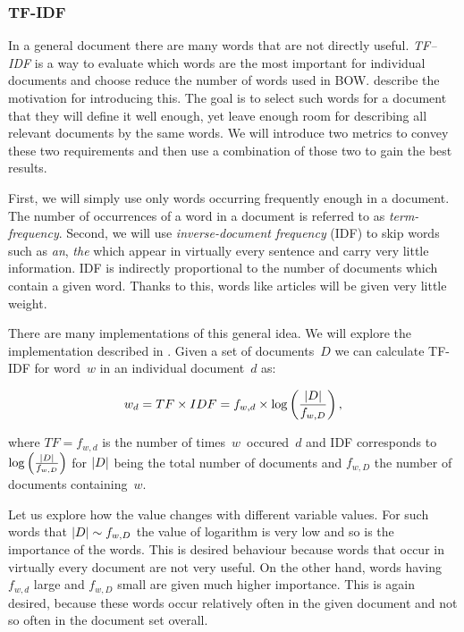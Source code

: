 \subsubsection{TF-IDF}

In a general document there are many words that are not directly useful.
{\it TF--IDF} is a way to evaluate which words are the most important for individual documents and
choose reduce the number of words used in BOW.
\citet{SalBuc88} describe the motivation for introducing this.
The goal is to select such words for a document
that they will define it well enough, yet leave enough room for describing all relevant documents by the same words.
We will introduce two metrics to convey these two requirements and then use a combination of those two to gain the best results.

First, we will simply use only words occurring frequently enough in a document.
The number of occurrences of a word in a document is referred to as {\it term-frequency}.
Second, we will use {\it inverse-document frequency} (IDF) to skip words such as {\it an}, {\it the} which appear in virtually every sentence and carry very little information.
IDF is indirectly proportional to the number of documents which contain a given word.
Thanks to this, words like articles will be given very little weight.

There are many implementations of this general idea.
We will explore the implementation described in \citet{Ramos03}.
Given a set of documents~$D$
we can calculate TF-IDF for word~$w$ in an individual document~$d$ as:

\[
	w_d = TF \times IDF = f_{w, d} \times \log \left( \frac{\left|{D}\right|}{f_{w,D}}  \right),
\]

where $TF = f_{w, d}$ is the number of times~$w$~occured~$d$ and
IDF corresponds to $\log \left( \frac{\left|{D}\right|}{f_{w,D}}  \right)$ for $\left|{D}\right|$ being the total number of documents and $f_{w, D}$ the number of documents containing~$w$.

Let us explore how the value changes with different variable values.
For such words that $\left|{D}\right| \sim f_{w, D}$ the value of logarithm is very low and so is the importance of the words.
This is desired behaviour because words that occur in virtually every document  are not very useful.
On the other hand, words having $f_{w,d}$ large and $f_{w,D}$ small are given much higher importance.
This is again desired, because these words occur relatively often in the given document and not so often in the document set overall.

